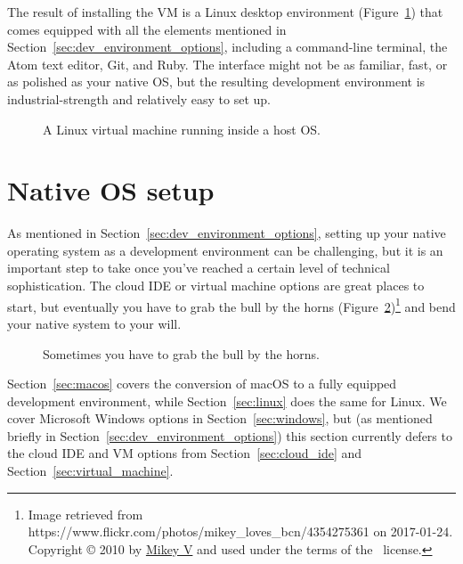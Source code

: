 The result of installing the VM is a Linux desktop environment (Figure~\ref{fig:virtual_machine}) that comes equipped with all the elements mentioned in Section~\ref{sec:dev_environment_options}, including a command-line terminal, the Atom text editor, Git, and Ruby. The interface might not be as familiar, fast, or as polished as your native OS, but the resulting development environment is industrial-strength and relatively easy to set up.

\begin{figure}
\begin{center}
\end{center}
\caption{A Linux virtual machine running inside a host OS.\label{fig:virtual_machine}}
\end{figure}



\section{Native OS setup} %
\label{sec:native_os_setup}

As mentioned in Section~\ref{sec:dev_environment_options}, setting up your native operating system as a development environment can be challenging, but it is an important step to take once you've reached a certain level of technical sophistication. The cloud IDE or virtual machine options are great places to start, but eventually you have to grab the bull by the horns (Figure~\ref{fig:grab_bull_by_horns})\footnote{Image retrieved from https://www.flickr.com/photos/mikey\_loves\_bcn/4354275361 on 2017-01-24. Copyright © 2010 by \href{https://www.flickr.com/photos/mikey_loves_bcn/}{Mikey V} and used under the terms of the \ccbync\ license.} and bend your native system to your will.

\begin{figure}
\begin{center}
\end{center}
\caption{Sometimes you have to grab the bull by the horns.\label{fig:grab_bull_by_horns}}
\end{figure}

Section~\ref{sec:macos} covers the conversion of macOS to a fully equipped development environment, while Section~\ref{sec:linux} does the same for Linux. We cover Microsoft Windows options in Section~\ref{sec:windows}, but (as mentioned briefly in Section~\ref{sec:dev_environment_options}) this section currently defers to the cloud IDE and VM options from Section~\ref{sec:cloud_ide} and Section~\ref{sec:virtual_machine}.


